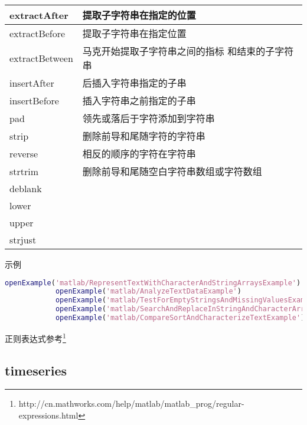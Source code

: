 \begin{longtable}{|l|l|}
            extractAfter & 提取子字符串在指定的位置\\\hline
            extractBefore &  提取子字符串在指定位置\\\hline
            extractBetween & 马克开始提取子字符串之间的指标 和结束的子字符串\\\hline
            insertAfter &  后插入字符串指定的子串\\\hline
            insertBefore & 插入字符串之前指定的子串\\\hline
            pad  & 领先或落后于字符添加到字符串\\\hline
            strip &  删除前导和尾随字符的字符串\\\hline
            reverse &  相反的顺序的字符在字符串\\\hline
            strtrim& 删除前导和尾随空白字符串数组或字符数组\\\hline
            deblank &{}\\\hline
            lower &{}\\\hline
            upper&{} \\\hline
            strjust &{}\\\hline
            \end{longtable}
            示例
                \begin{lstlisting}[language=Matlab]
            openExample('matlab/RepresentTextWithCharacterAndStringArraysExample')
            openExample('matlab/AnalyzeTextDataExample')
            openExample('matlab/TestForEmptyStringsAndMissingValuesExample')
            openExample('matlab/SearchAndReplaceInStringAndCharacterArraysExample')
            openExample('matlab/CompareSortAndCharacterizeTextExample')
                \end{lstlisting}
            正则表达式参考\footnote{http://cn.mathworks.com/help/matlab/matlab\_prog/regular-expressions.html}
    \subsection{timeseries}

